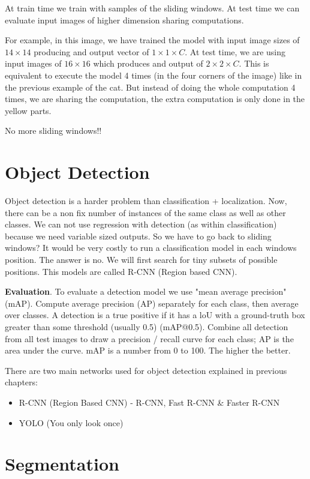 At train time we train with samples of the sliding windows. At test time we can evaluate input images of higher dimension sharing computations.

For example, in this image, we have trained the model with input image sizes of $14 \times 14$ producing and output vector of $1 \times 1 \times C$. At test time, we are using input images of $16 \times 16$ which produces and output of $2 \times 2 \times C$. This is equivalent to execute the model 4 times (in the four corners of the image) like in the previous example of the cat. But instead of doing the whole computation 4 times, we are sharing the computation, the extra computation is only done in the yellow parts.

No more sliding windows!!

\section{Object Detection}
Object detection is a harder problem than classification + localization. Now, there can be a non fix number of instances of the same class as well as other classes. We can not use regression with detection (as within classification) because we need variable sized outputs. So we have to go back to sliding windows? It would be very costly to run a classification model in each windows position. The answer is no. We will first search for tiny subsets of possible positions. This models are called R-CNN (Region based CNN).

\textbf{Evaluation}. To evaluate a detection model we use "mean average precision" (mAP). Compute average precision (AP) separately for each class, then average over classes. A detection is a true positive if it has a loU with a ground-truth box greater than some threshold (usually 0.5) (mAP@0.5). Combine all detection from all test images to draw a precision / recall curve for each class; AP is the area under the curve. mAP is a number from 0 to 100. The higher the better.

There are two main networks used for object detection explained in previous chapters:
\begin{itemize}
\item R-CNN (Region Based CNN) - R-CNN, Fast R-CNN \& Faster R-CNN
\item YOLO (You only look once)
\end{itemize}


\section{Segmentation}

